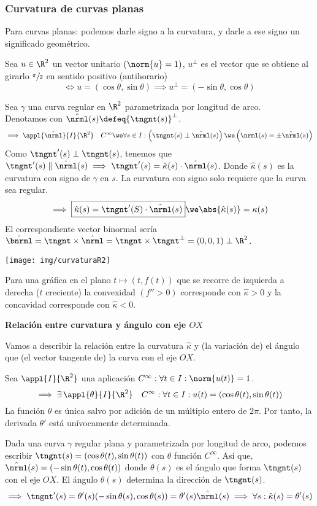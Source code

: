 \subsubsection{Curvatura de curvas planas}

Para curvas planas: podemos darle signo a la curvatura, y darle a ese signo un significado geométrico.
\begin{defn}
	Sea $u \in \R^2$ un vector unitario $(\norm{u}=1)$, $u^\perp$ es el vector que se obtiene al girarlo $\sfrac{\pi}{2}$ en sentido positivo (antihorario) $$\iff u=(\cos{\theta}, \sin{\theta}) \implies u^\perp=(-\sin{\theta}, \cos{\theta})$$
\end{defn}

Sea $\gamma$ una curva regular en $\R^2$ parametrizada por longitud de arco. \\
Denotamos con $\hat{\nrml}(s)\defeq{\tngnt(s)}^\perp$.
\[\implies \appl{\hat{\nrml}}{I}{\R^2} \quad C^\infty \we \forall s \in I : \left(\tngnt(s) \perp \hat{\nrml}(s)\right) \we \left(\nrml(s)=\pm \hat{\nrml}(s)\right)\]
Como $\tngnt'(s) \perp \tngnt(s)$, tenemos que $\tngnt'(s) \parallel \hat{\nrml}(s) \implies \tngnt'(s) = \hat{\kappa}(s) \cdot \hat{\nrml}(s)$. Donde $\hat{\kappa}(s)$ es la curvatura con signo de $\gamma$ en $s$.
La curvatura con signo solo requiere que la curva sea regular.
\[\implies \boxed{\hat{\kappa}(s)=\tngnt'(S)\cdot\hat{\nrml}(s)} \we \abs{\hat{\kappa}(s)}=\kappa(s)\]
El correspondiente vector binormal sería $\hat{\bnrml}=\tngnt\times\hat{\nrml}=\tngnt\times\tngnt^\perp=(0, 0, 1) \perp \R^2$.
\begin{center}
	\texttt{[image: img/curvaturaR2]}
\end{center}
Para una gráfica en el plano $t\mapsto (t, f(t))$ que se recorre de izquierda a derecha ($t$ creciente) la convexidad $(f'' > 0)$ corresponde con $\hat{\kappa} > 0$ y la concavidad corresponde con $\hat{\kappa} < 0$.

\textbf{Relación entre curvatura y ángulo con eje $OX$}

Vamos a describir la relación entre la curvatura $\hat{\kappa}$ y (la variación de) el ángulo que (el vector tangente de) la curva con el eje $OX$.

\begin{lem}
	Sea $\appl{I}{\R^2}$ una aplicación $C^\infty : \forall t\in I : \norm{u(t)} = 1$.
	\[\implies \exists\, \appl{\theta}{I}{\R^2} \quad C^\infty : \forall t \in I : u(t)=(\cos{\theta(t)}, \sin{\theta(t)})\]
	La función $\theta$ es única salvo por adición de un múltiplo entero de $2\pi$. Por tanto, la derivada $\theta'$ está unívocamente determinada.
\end{lem}
Dada una curva $\gamma$ regular plana y parametrizada por longitud de arco, podemos escribir $\tngnt(s)=(\cos{\theta(t)}, \sin{\theta(t)})$ con $\theta$ función $C^\infty$. Así que, $\hat{\nrml}(s)=(-\sin{\theta(t)}, \cos{\theta(t)})$ donde $\theta(s)$ es el ángulo que forma $\tngnt(s)$ con el eje $OX$. El ángulo $\theta(s)$ determina la dirección de $\tngnt(s)$.
\[\implies \tngnt'(s)=\theta'(s)(-\sin{\theta(s)}, \cos{\theta(s)})=\theta'(s) \hat{\nrml}(s) \implies \forall s : \hat{\kappa}(s) = \theta'(s)\]

